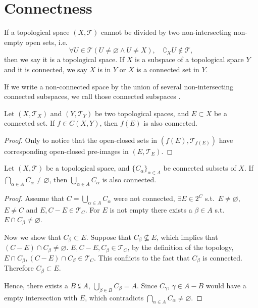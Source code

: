 \documentclass[openany]{book}
\begin{document}
\section{Connectness}

\begin{definition}[Connectness]%
	\label{def: Connectness}
	If a topological space $(X, \mathscr T)$ cannot be divided by two non-intersecting non-empty open sets, i.e.\ 
	\begin{equation*}
		\forall U \in \mathscr T (U \neq \varnothing \wedge U \neq X), \quad \complement_X U \notin \mathscr T,
	\end{equation*}
	then we say it is a  topological space.
	If $X$ is a subspace of a topological space $Y$ and it is connected, we say $X$ is  in $Y$ or $X$ is a connected set in $Y$.
\end{definition}

If we write a non-connected space by the union of several non-intersecting connected subspaces, we call those connected subspaces %
	\index{connected branch}.

\begin{theorem}\label{theorem: conservation of connectedness}
	Let $(X, \mathscr T_X)$ and $(Y, \mathscr T_Y)$ be two topological spaces, and $E \subset X$ be a connected set. 
	If $f \in C(X, Y)$, then $f(E)$ is also connected.
\end{theorem}
\begin{proof}
	Only to notice that the open-closed sets in $(f(E), \mathscr T_{f(E)})$ have corresponding open-closed pre-images in $(E, \mathscr T_E)$.
\end{proof}


\begin{theorem}\label{theorem: union of connected sets}
	Let $(X, \mathscr T)$ be a topological space, and $\{C_\alpha\}_{\alpha \in A}$ be connected subsets of $X$. 
	If $\bigcap_{ \alpha \in A} C_\alpha \neq \varnothing$, then $\bigcup\limits_{\alpha \in A} C_\alpha$ is also connected. 
\end{theorem}
\begin{proof}
	Assume that $C = \bigcup_{\alpha \in A} C_\alpha$ were not connected, $\exists E \in 2^C$ s.t.\ $E \neq \varnothing$, $E \neq C$ and $E, C - E \in \mathscr T_C$. 
	For $E$ is not empty there exists a $\beta \in A$ s.t.\ $E \cap C_\beta \neq \varnothing$. 
	
	Now we show that $C_\beta \subset  E$.
	Suppose that $C_\beta \nsubseteq  E$, which implies that $(C - E) \cap C_\beta \neq \varnothing$. 
	$E, C - E, C_\beta \in \mathscr T_C$, by the definition of the topology, 
	$E \cap C_\beta, (C - E) \cap C_\beta \in \mathscr T_C$. 
	This conflicts to the fact that $C_\beta$ is connected. 
	Therefore $C_\beta \subset  E$. 

	Hence, there exists a $B \subsetneqq A$, $\bigcup_{ \beta \in B} C_\beta = A$. 
	Since $C_\gamma$, $\gamma \in A - B$ would have a empty intersection with $E$, which contradicts $\bigcap_{ \alpha \in A} C_\alpha \neq \varnothing$.
\end{proof}
\end{document}
